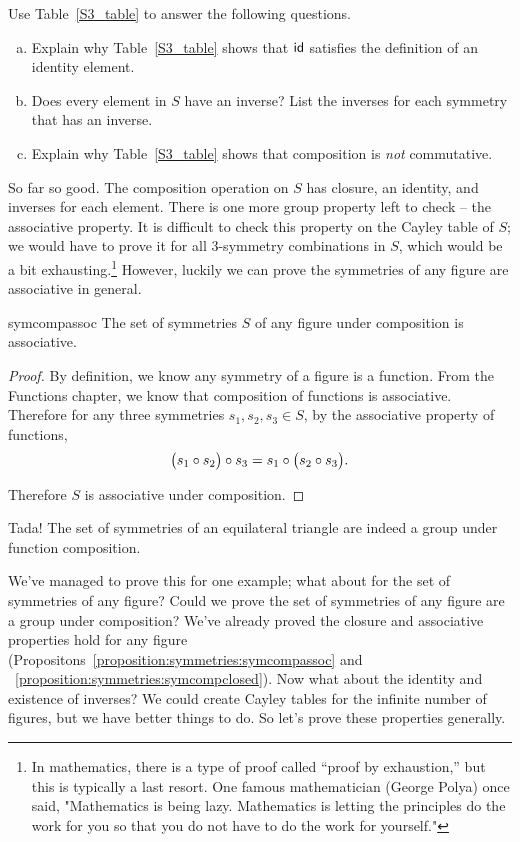 \begin{exercise}{20}
Use Table~\ref{S3_table} to answer the following questions. 
\begin{enumerate}[(a)]
\item
Explain why Table~\ref{S3_table} shows that ${\sf{i}d}$ satisfies the definition of an identity element.
\item
Does every element in $S$ have an inverse?  List the inverses for each symmetry that has an inverse.
\item
Explain why Table~\ref{S3_table} shows that composition is \emph{not} commutative.
\end{enumerate}
\end{exercise}

So far so good.  The composition operation on $S$ has closure, an identity, and inverses for each element.  There is one more group property left to check -- the associative property. It is difficult to check this property on the Cayley table of $S$; we would have to prove it for all 3-symmetry combinations in $S$, which would be a bit exhausting.\footnote{In mathematics, there is a type of proof called ``proof by exhaustion,'' but this is typically a last resort. One famous mathematician (George Polya) once said, "Mathematics is being lazy. Mathematics is letting the principles do the work for you so that you do not have to do the work for yourself."}  
However, luckily we can prove the symmetries of any figure are associative in general.

\begin{prop}{symcompassoc}
The set of symmetries $S$ of any figure under composition is associative.
\end{prop}

\begin{proof}
By definition, we know any symmetry of a figure is a function.  From the Functions chapter, we know that composition of functions is associative.  Therefore for any three symmetries $s_1, s_2, s_3 \in S$, by the associative property of functions, 
\[ \bigl( s_1 \circ s_2 \bigr) \circ s_3 = s_1 \circ \bigl( s_2 \circ s_3 \bigr). \]

\noindent
Therefore $S$ is associative under composition.
\end{proof}
\medskip

Tada!  The set of symmetries of an equilateral triangle are indeed a group under function composition.  
\medskip

We've managed to prove this for one example; what about for the set of symmetries of any figure?  Could we prove the set of symmetries of any figure are a group under composition?  We've already proved the closure and associative properties hold for any figure (Propositons~\ref{proposition:symmetries:symcompassoc} and ~\ref{proposition:symmetries:symcompclosed}).  Now what about the identity and existence of inverses?  We could create Cayley tables for the infinite number of figures, but we have better things to do.  So let's prove these properties generally.  

